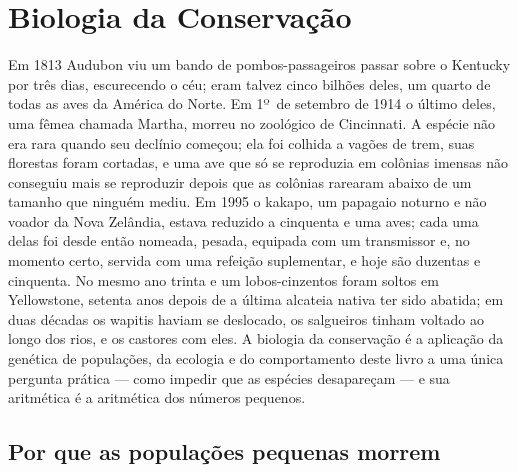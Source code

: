 \chapter{Biologia da Conservação}\label{ch:b3:conservation-biology}

Em 1813 Audubon viu um bando de pombos-passageiros passar sobre o
Kentucky por três dias, escurecendo o céu; eram talvez cinco bilhões
deles, um quarto de todas as aves da América do Norte. Em 1º~de setembro
de 1914 o último deles, uma fêmea chamada Martha, morreu no zoológico de
Cincinnati. A espécie não era rara quando seu declínio começou; ela foi
colhida a vagões de trem, suas florestas foram cortadas, e uma ave que só
se reproduzia em colônias imensas não conseguiu mais se reproduzir depois
que as colônias rarearam abaixo de um tamanho que ninguém mediu. Em 1995
o kakapo, um papagaio noturno e não voador da Nova Zelândia, estava
reduzido a cinquenta e uma aves; cada uma delas foi desde então nomeada,
pesada, equipada com um transmissor e, no momento certo, servida com uma
refeição suplementar, e hoje são duzentas e cinquenta. No mesmo ano trinta
e um lobos-cinzentos foram soltos em Yellowstone, setenta anos depois de a
última alcateia nativa ter sido abatida; em duas décadas os wapitis haviam
se deslocado, os salgueiros tinham voltado ao longo dos rios, e os castores
com eles. A biologia da conservação é a aplicação da genética de
populações, da ecologia e do comportamento deste livro a uma única
pergunta prática --- como impedir que as espécies desapareçam --- e sua
aritmética é a aritmética dos números pequenos.

\section{Por que as populações pequenas morrem}


